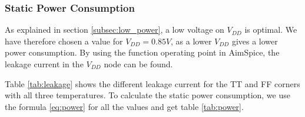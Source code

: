 \subsubsection{Static Power Consumption}

As explained in section \ref{subsec:low_power}, a low voltage on $V_{DD}$ is optimal. We have therefore chosen a value for $V_{DD} = 0.85V$, as a lower $V_{DD}$ gives a lower power consumption. By using the function operating point in AimSpice, the leakage current in the $V_{DD}$ node can be found.

Table \ref{tab:leakage} shows the different leakage current for the TT and FF corners with all three temperatures. To calculate the static power consumption, we use the formula \ref{eq:power} for all the values and get table \ref{tab:power}.

\begin{table}[H]
\centering
\caption{Leakage Current}
\label{tab:leakage}
\end{table}

\begin{table}[H]
\centering
\caption{Static Power Consumption}
\label{tab:power}
\end{table}

